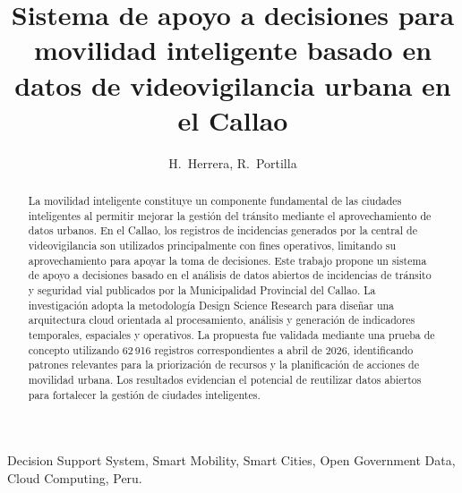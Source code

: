 \documentclass[]{IEEEphot}
\begin{document}
\title{Sistema de apoyo a decisiones para movilidad inteligente basado en datos de videovigilancia urbana en el Callao}

\author{H.~Herrera,  
R.~Portilla\\ 
}

\maketitle

\begin{abstract}
La movilidad inteligente constituye un componente fundamental de las ciudades inteligentes al permitir mejorar la gestión del tránsito mediante el aprovechamiento de datos urbanos. En el Callao, los registros de incidencias generados por la central de videovigilancia son utilizados principalmente con fines operativos, limitando su aprovechamiento para apoyar la toma de decisiones. Este trabajo propone un sistema de apoyo a decisiones basado en el análisis de datos abiertos de incidencias de tránsito y seguridad vial publicados por la Municipalidad Provincial del Callao. La investigación adopta la metodología Design Science Research para diseñar una arquitectura cloud orientada al procesamiento, análisis y generación de indicadores temporales, espaciales y operativos. La propuesta fue validada mediante una prueba de concepto utilizando 62\,916 registros correspondientes a abril de 2026, identificando patrones relevantes para la priorización de recursos y la planificación de acciones de movilidad urbana. Los resultados evidencian el potencial de reutilizar datos abiertos para fortalecer la gestión de ciudades inteligentes.
\end{abstract}
\begin{IEEEkeywords}
Decision Support System, Smart Mobility, Smart Cities, Open Government Data, Cloud Computing, Peru.
\end{IEEEkeywords}
\end{document}
